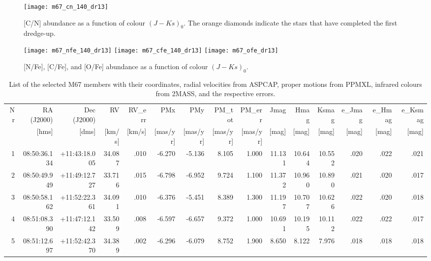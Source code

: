 \documentclass[a4paper,fleqn,usenatbib]{mnras}
\begin{document}
\begin{figure}
	\texttt{[image: m67\_cn\_140\_dr13]}
	\caption{[C/N] abundance as a function of colour $(J-Ks)_0$. The orange diamonds indicate the stars that have completed the first dredge-up.}
	\label{fig:cn_dr13}
\end{figure}

\begin{figure}
	\texttt{[image: m67\_nfe\_140\_dr13]}
	\texttt{[image: m67\_cfe\_140\_dr13]}
	\texttt{[image: m67\_ofe\_dr13]}
	\caption{[N/Fe], [C/Fe], and [O/Fe] abundance as a function of colour $(J-Ks)_0$.}
	\label{fig:nfe_dr13}
\end{figure}



\newpage
	\begin{landscape}
\begin{table}
	\caption{List of the selected M67 members with their coordinates, radial velocities from ASPCAP, proper motions from PPMXL, infrared colours from 2MASS, and the respective errors.}
\begin{tabular}{|r|r|r|r|r|r|r|r|r|r|r|r|r|r|r|}
	\hline
	\multicolumn{1}{|r|}{Nr} &
	\multicolumn{1}{r|}{RA (J2000)} &
	\multicolumn{1}{r|}{Dec (J2000)} &
	\multicolumn{1}{r|}{RV} &
	\multicolumn{1}{r|}{RV\_err} &
	\multicolumn{1}{r|}{PMx} &
	\multicolumn{1}{r|}{PMy} &
	\multicolumn{1}{r|}{PM\_tot} &
	\multicolumn{1}{r|}{PM\_err} &
	\multicolumn{1}{r|}{Jmag} &
	\multicolumn{1}{r|}{Hmag} &
	\multicolumn{1}{r|}{Ksmag} &
	\multicolumn{1}{r|}{e\_Jmag} &
	\multicolumn{1}{r|}{e\_Hmag} &
	\multicolumn{1}{r|}{e\_Ksmag} \\
	{}&{[hms]}&{[dms]}&{[km/s]}&{[km/s]}&{[mas/yr]}&{[mas/yr]}&{[mas/yr]}&{[mas/yr]}&{[mag]}&{[mag]}&{[mag]}&{[mag]}&{[mag]}&{[mag]}\\
	\hline
  1 & 08:50:36.134 & +11:43:18.005 & 34.087 & .010 & -6.270 & -5.136 & 8.105 & 1.000 & 11.131 & 10.644 & 10.552 & .020 & .022 & .021\\
  2 & 08:50:49.949 & +11:49:12.727 & 33.716 & .015 & -6.798 & -6.952 & 9.724 & 1.100 & 11.372 & 10.960 & 10.890 & .021 & .020 & .017\\
  3 & 08:50:58.162 & +11:52:22.361 & 34.091 & .010 & -6.376 & -5.451 & 8.389 & 1.300 & 11.197 & 10.707 & 10.626 & .022 & .020 & .018\\
  4 & 08:51:08.390 & +11:47:12.142 & 33.509 & .008 & -6.597 & -6.657 & 9.372 & 1.000 & 10.691 & 10.195 & 10.112 & .022 & .022 & .017\\
  5 & 08:51:12.697 & +11:52:42.370 & 34.389 & .002 & -6.296 & -6.079 & 8.752 & 1.900 & 8.650 & 8.122 & 7.976 & .018 & .018 & .018\\

\end{tabular}
\end{table}
\end{landscape}
\end{document}
